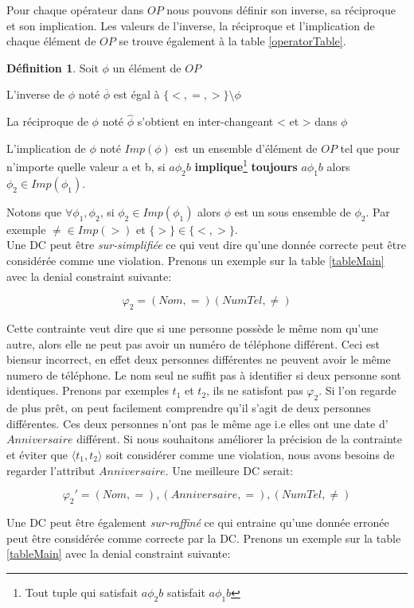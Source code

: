 \documentclass[letterpaper, 12pt]{report}
\theoremstyle{definition}
\newtheorem{mydef}{Définition}
\begin{document}
Pour chaque opérateur dans $OP$ nous pouvons définir son inverse, sa réciproque et son implication. Les valeurs de l'inverse, la réciproque et l'implication de chaque élément de $OP$ se trouve également à la table \ref{operatorTable}.
\begin{mydef}
Soit $\phi$ un élément de $OP$

L'inverse de $\phi$ noté $\overline{\phi}$ est égal à $\{<,=,>\}\setminus \phi$

La réciproque de $\phi$ noté $\hat{\phi}$ s'obtient en inter-changeant < et > dans $\phi$

L'implication de $\phi$ noté $Imp(\phi)$ est un ensemble d'élément de $OP$ tel que pour n'importe quelle valeur a et b, si $a \phi_2 b$ \textbf{implique}\footnote{Tout tuple qui satisfait $a \phi_2 b$ satisfait $a \phi_1 b$} \textbf{toujours} $a \phi_1  b$ alors $\phi_2       \in Imp(\phi_1)$.
\end{mydef}

Notons que $\forall \phi_1,\phi_2$, si $\phi_2 \in Imp(\phi_1)$ alors $\phi$ est un sous ensemble de $\phi_2$. Par exemple $\neq \in Imp(>)$ et $\{ > \} \in \{<,> \}$.\\

Une DC peut être \emph{sur-simplifiée} ce qui veut dire qu'une donnée correcte peut être considérée comme une violation. Prenons un exemple sur la table \ref{tableMain} avec la denial constraint suivante:

$$\varphi_2 = (Nom,=)(NumTel,\neq) $$

Cette contrainte veut dire que si une personne possède le même nom qu'une autre, alors elle ne peut pas avoir un numéro de téléphone différent. Ceci est biensur incorrect, en effet deux personnes différentes ne peuvent avoir le même numero de téléphone. Le nom seul ne suffit pas à identifier si deux personne sont identiques. Prenons par exemples $t_1$ et $t_2$, ils ne satisfont pas $\varphi_2$. Si l'on regarde de plus prêt, on peut facilement comprendre qu'il s'agit de deux personnes différentes. Ces deux personnes n'ont pas le même age i.e elles ont une date d'$Anniversaire$ différent. Si nous souhaitons améliorer la précision de la contrainte et éviter que $\langle t_1,t_2\rangle$ soit considérer comme une violation, nous avons besoins de regarder l'attribut $Anniversaire$. Une meilleure DC serait:

$$\varphi_2' = (Nom,=),(Anniversaire,=),(NumTel,\neq) $$

Une DC peut être également \emph{sur-raffiné} ce qui entraine qu'une donnée erronée peut être considérée comme correcte par la DC. Prenons un exemple sur la table \ref{tableMain} avec la denial constraint suivante:
\end{document}
